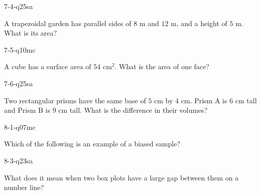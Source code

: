 \begin{practiceQuestion}{7-4-q25}{sa}
\begin{questionText}
A trapezoidal garden has parallel sides of $8$ m and $12$ m, and a height of $5$ m. What is its area?
\end{questionText}
\end{practiceQuestion}

\begin{practiceQuestion}{7-5-q10}{mc}
\begin{questionText}
A cube has a surface area of $54$ cm$^2$. What is the area of one face?
\end{questionText}
\end{practiceQuestion}

\begin{practiceQuestion}{7-6-q25}{sa}
\begin{questionText}
Two rectangular prisms have the same base of $5$ cm by $4$ cm. Prism A is $6$ cm tall and Prism B is $9$ cm tall. What is the difference in their volumes?
\end{questionText}
\end{practiceQuestion}

\begin{practiceQuestion}{8-1-q07}{mc}
\begin{questionText}
Which of the following is an example of a biased sample?
\end{questionText}
\end{practiceQuestion}

\begin{practiceQuestion}{8-3-q23}{sa}
\begin{questionText}
What does it mean when two box plots have a large gap between them on a number line?
\end{questionText}
\end{practiceQuestion}

